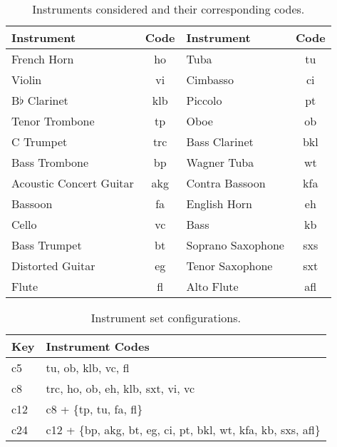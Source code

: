 \begin{table*}[h]
\begin{center}
\caption{Instruments considered and their corresponding codes.}
\begin{tabular}{l | c || l | c}
Instrument & Code & Instrument & Code \\

\hline
French Horn & ho & Tuba & tu\\
Violin & vi & Cimbasso & ci \\
B$\flat$ Clarinet & klb & Piccolo & pt \\
Tenor Trombone & tp & Oboe & ob \\
C Trumpet & trc & Bass Clarinet & bkl \\
Bass Trombone & bp & Wagner Tuba & wt \\
Acoustic Concert Guitar & akg & Contra Bassoon & kfa \\
Bassoon & fa & English Horn & eh \\
Cello & vc & Bass & kb \\
Bass Trumpet & bt & Soprano Saxophone & sxs \\
Distorted Guitar & eg & Tenor Saxophone & sxt \\
Flute & fl & Alto Flute & afl \\

\hline
\end{tabular}
\label{tab:things}
\end{center}
\end{table*}



\begin{table*}[h]
\begin{center}
\caption{Instrument set configurations.}
\begin{tabular}{l | l }
Key & Instrument Codes \\
\hline

c5 & tu, ob, klb, vc, fl \\
c8 & trc, ho, ob, eh, klb, sxt, vi, vc \\
c12 & c8 + \{tp, tu, fa, fl\} \\
c24 & c12 + \{bp, akg, bt, eg, ci, pt, bkl, wt, kfa, kb, sxs, afl\} \\

\hline
\end{tabular}
\label{tab:things}
\end{center}
\end{table*}




